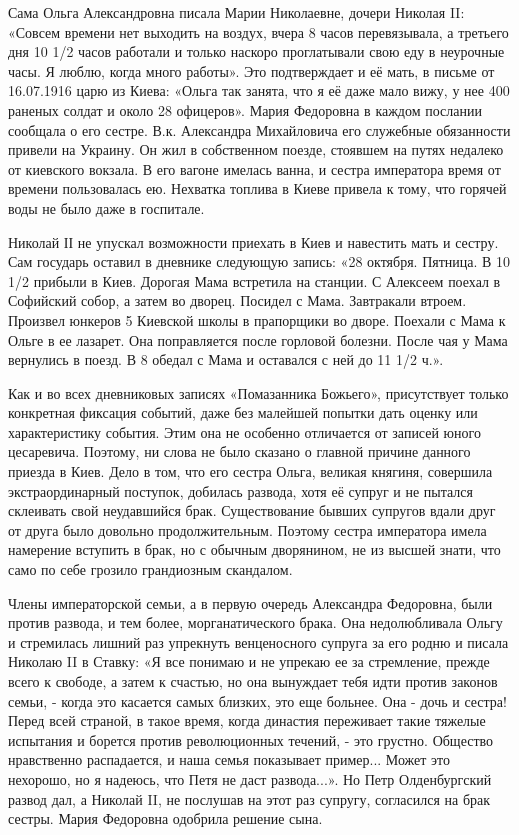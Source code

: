 Сама
Ольга Александровна писала Марии Николаевне, дочери Николая II: «Совсем времени
нет выходить на воздух, вчера 8 часов перевязывала, а третьего дня 10 1/2 часов
работали и только наскоро проглатывали свою еду в неурочные часы. Я люблю,
когда много работы». Это подтверждает и её мать, в письме от 16.07.1916 царю из
Киева: «Ольга так занята, что я её даже мало вижу, у нее 400 раненых солдат и
около 28 офицеров». Мария Федоровна в каждом послании сообщала о его сестре.
В.к. Александра Михайловича его служебные обязанности привели на Украину. Он
жил в собственном поезде, стоявшем на путях недалеко от киевского вокзала. В
его вагоне имелась ванна, и сестра императора время от времени пользовалась ею.
Нехватка топлива в Киеве привела к тому, что горячей воды не было даже в
госпитале.

Николай ІІ не упускал возможности приехать в Киев и навестить мать и сестру.
Сам государь оставил в дневнике следующую запись: «28 октября. Пятница. В 10
1/2 прибыли в Киев. Дорогая Мама встретила на станции. С Алексеем поехал в
Софийский собор, а затем во дворец. Посидел с Мама. Завтракали втроем. Произвел
юнкеров 5 Киевской школы в прапорщики во дворе. Поехали с Мама к Ольге в ее
лазарет. Она поправляется после горловой болезни. После чая у Мама вернулись в
поезд. В 8 обедал с Мама и оставался с ней до 11 1/2 ч.».

Как и во всех дневниковых записях «Помазанника Божьего», присутствует только
конкретная фиксация событий, даже без малейшей попытки дать оценку или
характеристику события. Этим она не особенно отличается от записей юного
цесаревича. Поэтому, ни слова не было сказано о главной причине данного приезда
в Киев. Дело в том, что его сестра Ольга, великая княгиня, совершила
экстраординарный поступок, добилась развода, хотя её супруг и не пытался
склеивать свой неудавшийся брак. Существование бывших супругов вдали друг от
друга было довольно продолжительным. Поэтому сестра императора имела намерение
вступить в брак, но с обычным дворянином, не из высшей знати, что само по себе
грозило грандиозным скандалом. 

Члены императорской семьи, а в первую очередь Александра Федоровна, были против
развода, и тем более, морганатического брака.  Она недолюбливала Ольгу и
стремилась лишний раз упрекнуть венценосного супруга за его родню и писала
Николаю II в Ставку: «Я все понимаю и не упрекаю ее за стремление, прежде всего
к свободе, а затем к счастью, но она вынуждает тебя идти против законов семьи,
- когда это касается самых близких, это еще больнее.  Она - дочь и сестра!
Перед всей страной, в такое время, когда династия переживает такие тяжелые
испытания и борется против революционных течений, - это грустно. Общество
нравственно распадается, и наша семья показывает пример...  Может это нехорошо,
но я надеюсь, что Петя не даст развода...». Но Петр Олденбургский развод дал, а
Николай II, не послушав на этот раз супругу, согласился на брак сестры. Мария
Федоровна одобрила решение сына. 

